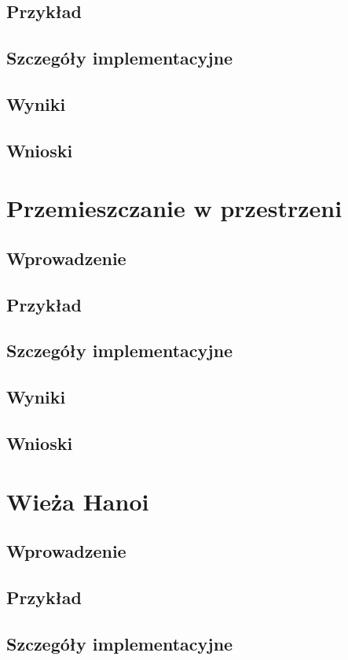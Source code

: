     \subsection{Przykład}
    \subsection{Szczegóły implementacyjne}
    \subsection{Wyniki}
    \subsection{Wnioski}
\section{Przemieszczanie w przestrzeni}
    \subsection{Wprowadzenie}
    \subsection{Przykład}
    \subsection{Szczegóły implementacyjne}
    \subsection{Wyniki}
    \subsection{Wnioski}
\section{Wieża Hanoi}
    \subsection{Wprowadzenie}
    \subsection{Przykład}
    \subsection{Szczegóły implementacyjne}
